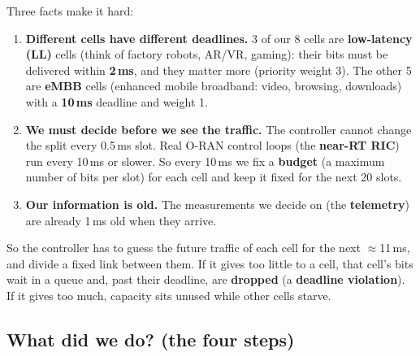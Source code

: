 \documentclass[11pt,a4paper]{article}
\begin{document}
Three facts make it hard:
\begin{enumerate}
  \item \textbf{Different cells have different deadlines.} 3 of our 8 cells are \textbf{low-latency (LL)} cells (think of factory robots, AR/VR, gaming): their bits must be delivered within \textbf{2\,ms}, and they matter more (priority weight 3). The other 5 are \textbf{eMBB} cells (enhanced mobile broadband: video, browsing, downloads) with a \textbf{10\,ms} deadline and weight 1.
  \item \textbf{We must decide before we see the traffic.} The controller cannot change the split every 0.5\,ms slot. Real O-RAN control loops (the \textbf{near-RT RIC}) run every 10\,ms or slower. So every 10\,ms we fix a \textbf{budget} (a maximum number of bits per slot) for each cell and keep it fixed for the next 20 slots.
  \item \textbf{Our information is old.} The measurements we decide on (the \textbf{telemetry}) are already 1\,ms old when they arrive.
\end{enumerate}
So the controller has to guess the future traffic of each cell for the next $\approx$11\,ms, and divide a fixed link between them. If it gives too little to a cell, that cell's bits wait in a queue and, past their deadline, are \textbf{dropped} (a \textbf{deadline violation}). If it gives too much, capacity sits unused while other cells starve.

\subsection{What did we do? (the four steps)}

\begin{center}
\end{center}
\end{document}
